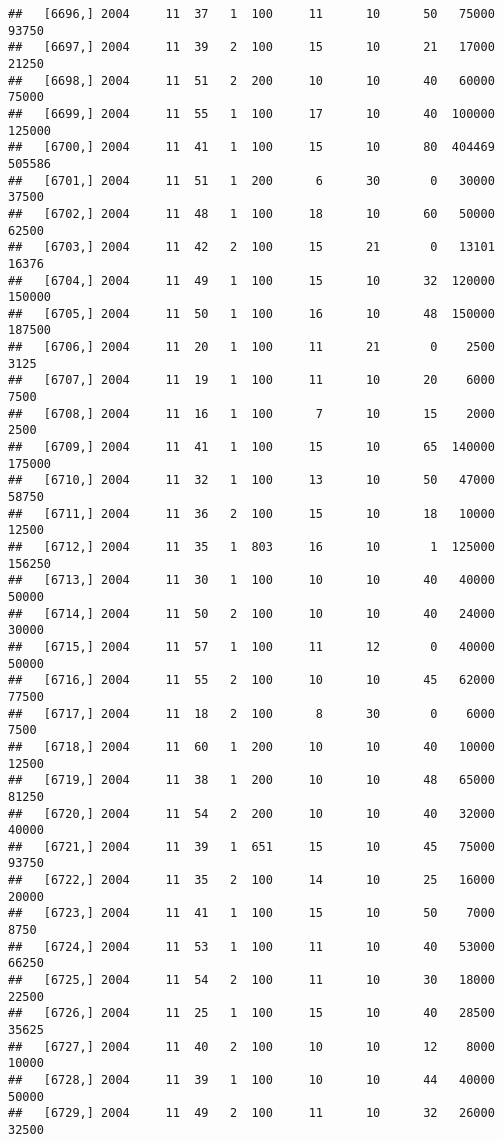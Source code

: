 \documentclass{article}\usepackage[]{graphicx}\usepackage[]{color}
\makeatletter
\newenvironment{kframe}{%
 \def\at@end@of@kframe{}%
 \ifinner\ifhmode%
  \def\at@end@of@kframe{\end{minipage}}%
  \begin{minipage}{\columnwidth}%
 \fi\fi%
 \def\FrameCommand##1{\hskip\@totalleftmargin \hskip-\fboxsep
 \colorbox{shadecolor}{##1}\hskip-\fboxsep
     \hskip-\linewidth \hskip-\@totalleftmargin \hskip\columnwidth}%
 \MakeFramed {\advance\hsize-\width
   \@totalleftmargin\z@ \linewidth\hsize
   \@setminipage}}%
 {\par\unskip\endMakeFramed%
 \at@end@of@kframe}
\newenvironment{knitrout}{}{} %
\makeatother
\begin{document}
\begin{knitrout}
\begin{kframe}
\begin{verbatim}
##   [6696,] 2004     11  37   1  100     11      10      50   75000   93750
##   [6697,] 2004     11  39   2  100     15      10      21   17000   21250
##   [6698,] 2004     11  51   2  200     10      10      40   60000   75000
##   [6699,] 2004     11  55   1  100     17      10      40  100000  125000
##   [6700,] 2004     11  41   1  100     15      10      80  404469  505586
##   [6701,] 2004     11  51   1  200      6      30       0   30000   37500
##   [6702,] 2004     11  48   1  100     18      10      60   50000   62500
##   [6703,] 2004     11  42   2  100     15      21       0   13101   16376
##   [6704,] 2004     11  49   1  100     15      10      32  120000  150000
##   [6705,] 2004     11  50   1  100     16      10      48  150000  187500
##   [6706,] 2004     11  20   1  100     11      21       0    2500    3125
##   [6707,] 2004     11  19   1  100     11      10      20    6000    7500
##   [6708,] 2004     11  16   1  100      7      10      15    2000    2500
##   [6709,] 2004     11  41   1  100     15      10      65  140000  175000
##   [6710,] 2004     11  32   1  100     13      10      50   47000   58750
##   [6711,] 2004     11  36   2  100     15      10      18   10000   12500
##   [6712,] 2004     11  35   1  803     16      10       1  125000  156250
##   [6713,] 2004     11  30   1  100     10      10      40   40000   50000
##   [6714,] 2004     11  50   2  100     10      10      40   24000   30000
##   [6715,] 2004     11  57   1  100     11      12       0   40000   50000
##   [6716,] 2004     11  55   2  100     10      10      45   62000   77500
##   [6717,] 2004     11  18   2  100      8      30       0    6000    7500
##   [6718,] 2004     11  60   1  200     10      10      40   10000   12500
##   [6719,] 2004     11  38   1  200     10      10      48   65000   81250
##   [6720,] 2004     11  54   2  200     10      10      40   32000   40000
##   [6721,] 2004     11  39   1  651     15      10      45   75000   93750
##   [6722,] 2004     11  35   2  100     14      10      25   16000   20000
##   [6723,] 2004     11  41   1  100     15      10      50    7000    8750
##   [6724,] 2004     11  53   1  100     11      10      40   53000   66250
##   [6725,] 2004     11  54   2  100     11      10      30   18000   22500
##   [6726,] 2004     11  25   1  100     15      10      40   28500   35625
##   [6727,] 2004     11  40   2  100     10      10      12    8000   10000
##   [6728,] 2004     11  39   1  100     10      10      44   40000   50000
##   [6729,] 2004     11  49   2  100     11      10      32   26000   32500

\end{verbatim}
\end{kframe}
\end{knitrout}
\end{document}
